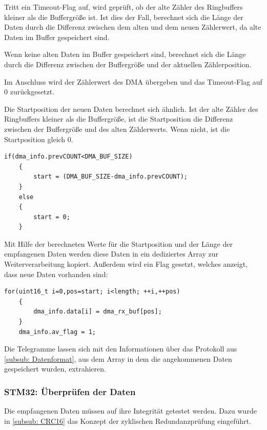  Tritt ein Timeout-Flag auf, wird geprüft, ob der alte Zähler des Ringbuffers kleiner als die Buffergröße ist. Ist dies der Fall, berechnet
  sich die Länge der Daten durch die Differenz zwischen dem alten und dem neuen Zählerwert, da alte Daten im Buffer gespeichert sind.
  
  Wenn keine alten Daten im Buffer gespeichert sind, berechnet sich die Länge durch die Differenz zwischen der Buffergröße und der aktuellen Zählerposition.

  \smallskip

  Im Anschluss wird der Zählerwert des \ac{DMA} übergeben und das Timeout-Flag auf 0 zurückgesetzt.

  \smallskip

  Die Startposition der neuen Daten berechnet sich ähnlich. Ist der alte Zähler des Ringbuffers kleiner als die Buffergröße, ist die Startposition
  die Differenz zwischen der Buffergröße und des alten Zählerwerts. Wenn nicht, ist die Startposition gleich 0.

  \begin{lstlisting}[caption={\textit{Berechnung Startposition}}]
    if(dma_info.prevCOUNT<DMA_BUF_SIZE)
    {
    	start = (DMA_BUF_SIZE-dma_info.prevCOUNT);
    }
    else
    {
    	start = 0;
    }  
  \end{lstlisting}

  \smallskip

  Mit Hilfe der berechneten Werte für die Startposition und der Länge der empfangenen Daten werden diese Daten in ein dediziertes
  Array zur Weiterverarbeitung kopiert. Außerdem wird ein Flag gesetzt, welches anzeigt, dass neue Daten vorhanden sind:
  
  \begin{lstlisting}[caption={\textit{Kopieren neuer Daten}}]
    for(uint16_t i=0,pos=start; i<length; ++i,++pos)
    {
        dma_info.data[i] = dma_rx_buf[pos];
    }
    dma_info.av_flag = 1;
  \end{lstlisting}

  Die Telegramme lassen sich mit den Informationen über das Protokoll aus \ref{subsub: Datenformat}, aus dem Array in dem die angekommenen
  Daten gespeichert wurden, extrahieren.

\subsubsection{STM32: Überprüfen der Daten}
\label{subsub: data_check}

Die empfangenen Daten müssen auf ihre Integrität getestet werden. Dazu wurde in \ref{subsub: CRC16} das Konzept der zyklischen Redundanzprüfung eingeführt.

